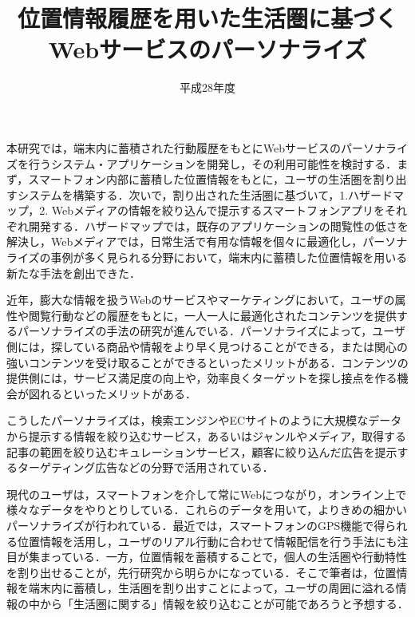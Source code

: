 \documentclass[a4paper]{jsarticle}
\begin{document}
 \masterthesis


\title{位置情報履歴を用いた生活圏に基づくWebサービスのパーソナライズ}
\date{平成28年度}
\maketitle


\setcounter{page}{1} %

本研究では，端末内に蓄積された行動履歴をもとにWebサービスのパーソナライズを行うシステム・アプリケーションを開発し，その利用可能性を検討する．まず，スマートフォン内部に蓄積した位置情報をもとに，ユーザの生活圏を割り出すシステムを構築する．次いで，割り出された生活圏に基づいて，1.ハザードマップ，2. Webメディアの情報を絞り込んで提示するスマートフォンアプリをそれぞれ開発する．ハザードマップでは，既存のアプリケーションの閲覧性の低さを解決し，Webメディアでは，日常生活で有用な情報を個々に最適化し，パーソナライズの事例が多く見られる分野において，端末内に蓄積した位置情報を用いる新たな手法を創出できた．

近年，膨大な情報を扱うWebのサービスやマーケティングにおいて，ユーザの属性や閲覧行動などの履歴をもとに，一人一人に最適化されたコンテンツを提供するパーソナライズの手法の研究が進んでいる．パーソナライズによって，ユーザ側には，探している商品や情報をより早く見つけることができる，または関心の強いコンテンツを受け取ることができるといったメリットがある．コンテンツの提供側には，サービス満足度の向上や，効率良くターゲットを探し接点を作る機会が図れるといったメリットがある．

こうしたパーソナライズは，検索エンジンやECサイトのように大規模なデータから提示する情報を絞り込むサービス，あるいはジャンルやメディア，取得する記事の範囲を絞り込むキュレーションサービス，顧客に絞り込んだ広告を提示するターゲティング広告などの分野で活用されている．

現代のユーザは，スマートフォンを介して常にWebにつながり，オンライン上で様々なデータをやりとりしている．これらのデータを用いて，よりきめの細かいパーソナライズが行われている．最近では，スマートフォンのGPS機能で得られる位置情報を活用し，ユーザのリアル行動に合わせて情報配信を行う手法にも注目が集まっている．一方，位置情報を蓄積することで，個人の生活圏や行動特性を割り出せることが，先行研究から明らかになっている．そこで筆者は，位置情報を端末内に蓄積し，生活圏を割り出すことによって，ユーザの周囲に溢れる情報の中から「生活圏に関する」情報を絞り込むことが可能であろうと予想する．
\end{document}
